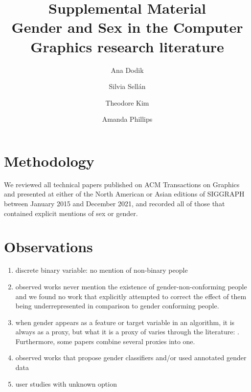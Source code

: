 \documentclass[nonacm,sigconf,review,balance=false]{acmart}
\begin{document}
\title{Supplemental Material \\
\Large{Gender and Sex in the Computer Graphics research literature}}

\author{Ana Dodik}

\author{Silvia Sellán}\authornotemark[1]


\author{Theodore Kim}

\author{Amanda Phillips}



\maketitle

\section{Methodology}

We reviewed all technical papers published on ACM Transactions on Graphics and
presented at either of the North American or Asian editions of SIGGRAPH between
January 2015 and December 2021, and recorded all of those that contained
explicit mentions of sex or gender.

\section{Observations}

\begin{enumerate}
    \item discrete binary variable: no mention of non-binary people
    \item observed works never mention the existence of gender-non-conforming people and we found no work that explicitly attempted to correct the effect of them being underrepresented in comparison to gender conforming people.
    \item when gender appears as a feature or target variable in an algorithm, it is always as a proxy, but what it is a proxy of varies through the literature: . Furthermore, some papers combine several proxies into one.
    \item observed works that propose gender classifiers and/or used annotated gender data
    \item user studies with unknown option
\end{enumerate}
\end{document}
